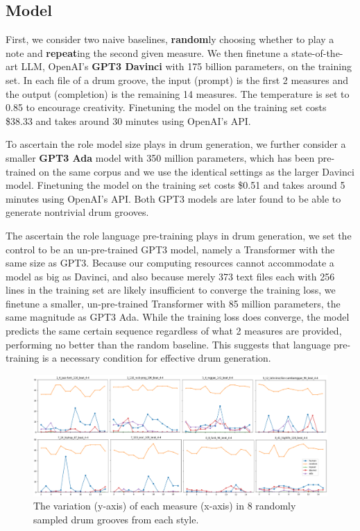 \documentclass[letterpaper]{article} %
\begin{document}
\subsection{Model}
First, we consider two naive baselines, \textbf{random}ly choosing whether to play a note and \textbf{repeat}ing the second given measure. We then finetune a state-of-the-art LLM, OpenAI's \textbf{GPT3 Davinci} with 175 billion parameters, on the training set. In each file of a drum groove, the input (prompt) is the first 2 measures and the output (completion) is the remaining 14 measures. The temperature is set to 0.85 to encourage creativity. Finetuning the model on the training set costs \$38.33 and takes around 30 minutes using OpenAI's API.

To ascertain the role model size plays in drum generation, we further consider a smaller \textbf{GPT3 Ada} model with 350 million parameters, which has been pre-trained on the same corpus and we use the identical settings as the larger Davinci model. Finetuning the model on the training set costs \$0.51 and takes around 5 minutes using OpenAI's API. Both GPT3 models are later found to be able to generate nontrivial drum grooves.

The ascertain the role language pre-training plays in drum generation, we set the control to be an un-pre-trained GPT3 model, namely a Transformer \cite{NIPS2017_3f5ee243} with the same size as GPT3. Because our computing resources cannot accommodate a model as big as Davinci, and also because merely 373 text files each with 256 lines in the training set are likely insufficient to converge the training loss, we finetune a smaller, un-pre-trained Transformer with 85 million parameters, the same magnitude as GPT3 Ada. While the training loss does converge, the model predicts the same certain sequence regardless of what 2 measures are provided, performing no better than the random baseline. This suggests that language pre-training is a necessary condition for effective drum generation.
\begin{figure}[t!]
    \centering
 \includegraphics[scale=0.55]{images/structure.png}
    \caption{The variation (y-axis) of each measure (x-axis) in 8 randomly sampled drum grooves from each style.}
    \label{fig:repetition_variation}
\end{figure}
\end{document}
